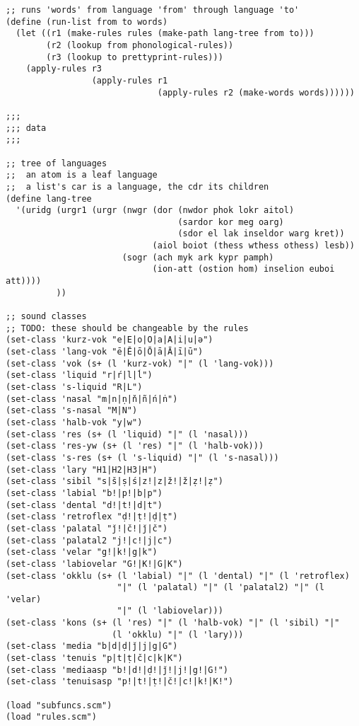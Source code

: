 \begin{verbatim}
;; runs 'words' from language 'from' through language 'to'
(define (run-list from to words)
  (let ((r1 (make-rules rules (make-path lang-tree from to)))
        (r2 (lookup from phonological-rules))
        (r3 (lookup to prettyprint-rules)))
    (apply-rules r3
                 (apply-rules r1
                              (apply-rules r2 (make-words words))))))

;;;
;;; data
;;;

;; tree of languages
;;  an atom is a leaf language
;;  a list's car is a language, the cdr its children
(define lang-tree
  '(uridg (urgr1 (urgr (nwgr (dor (nwdor phok lokr aitol)
                                  (sardor kor meg oarg)
                                  (sdor el lak inseldor warg kret))
                             (aiol boiot (thess wthess othess) lesb))
                       (sogr (ach myk ark kypr pamph)
                             (ion-att (ostion hom) inselion euboi att))))
          ))

;; sound classes
;; TODO: these should be changeable by the rules
(set-class 'kurz-vok "e|E|o|O|a|A|i|u|ə")
(set-class 'lang-vok "ē|Ē|ō|Ō|ā|Ā|ī|ū")
(set-class 'vok (s+ (l 'kurz-vok) "|" (l 'lang-vok)))
(set-class 'liquid "r|ŕ|l|ĺ")
(set-class 's-liquid "R|L")
(set-class 'nasal "m|n|ṇ|ň|ñ|ń|ṅ")
(set-class 's-nasal "M|N")
(set-class 'halb-vok "y|w")
(set-class 'res (s+ (l 'liquid) "|" (l 'nasal)))
(set-class 'res-yw (s+ (l 'res) "|" (l 'halb-vok)))
(set-class 's-res (s+ (l 's-liquid) "|" (l 's-nasal)))
(set-class 'lary "H1|H2|H3|H")
(set-class 'sibil "s|š|ṣ|ś|z!|z|ž!|ž|ẓ!|ẓ")
(set-class 'labial "b!|p!|b|p")
(set-class 'dental "d!|t!|d|t")
(set-class 'retroflex "ḍ!|ṭ!|ḍ|ṭ")
(set-class 'palatal "ǰ!|č!|ǰ|č")
(set-class 'palatal2 "j!|c!|j|c")
(set-class 'velar "g!|k!|g|k")
(set-class 'labiovelar "G!|K!|G|K")
(set-class 'okklu (s+ (l 'labial) "|" (l 'dental) "|" (l 'retroflex)
                      "|" (l 'palatal) "|" (l 'palatal2) "|" (l 'velar)
                      "|" (l 'labiovelar)))
(set-class 'kons (s+ (l 'res) "|" (l 'halb-vok) "|" (l 'sibil) "|"
                     (l 'okklu) "|" (l 'lary)))
(set-class 'media "b|d|ḍ|ǰ|j|g|G")
(set-class 'tenuis "p|t|ṭ|č|c|k|K")
(set-class 'mediaasp "b!|d!|ḍ!|ǰ!|j!|g!|G!")
(set-class 'tenuisasp "p!|t!|ṭ!|č!|c!|k!|K!")

(load "subfuncs.scm")
(load "rules.scm")
\end{verbatim}

